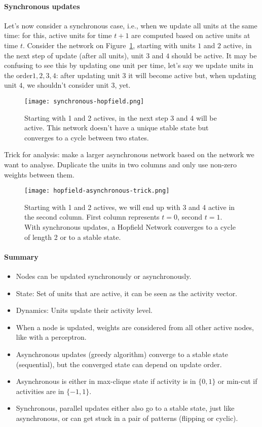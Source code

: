 \documentclass[main]{subfiles}
\begin{document}
\paragraph{Synchronous updates}
Let's now consider a synchronous case, i.e., when we update all units at the same time: for this, active units for time $t+1$ are computed based on active units at time $t$.
Consider the network on Figure~\ref{fig:synchronous-hopfield}, starting with units $1$ and $2$ active, in the next step of update (after all units), unit $3$ and $4$ should be active. It may be confusing to see this by updating one unit per time, let's say we update units in the order${1, 2, 3, 4}$: after updating unit $3$ it will become active but, when updating unit $4$, we shouldn't consider unit $3$, yet.

\begin{figure}[H]
	\centering
	\texttt{[image: synchronous-hopfield.png]}
	\caption{Starting with 1 and 2 actives, in the next step 3 and 4 will be active. This network doesn't have a unique stable state but converges to a cycle between two states.}
	\label{fig:synchronous-hopfield}
\end{figure}

Trick for analysis: make a larger asynchronous network based on the network we want to analyse. Duplicate the units in two columns and only use non-zero weights between them.

\begin{figure}[H]
	\centering
	\texttt{[image: hopfield-asynchronous-trick.png]}
	\caption{Starting with 1 and 2 actives, we will end up with 3 and 4 active in the second column. First column represents $t=0$, second $t=1$. With synchronous updates, a Hopfield Network converges to a cycle of length 2 or to a stable state.}
\end{figure}

\paragraph{Summary}
\begin{itemize}[noitemsep,nolistsep]
	\item Nodes can be updated synchronously or asynchronously.
	\item State: Set of units that are active, it can be seen as the activity vector.
	\item Dynamics: Units update their activity level.
	\item When a node is updated, weights are considered from all other active nodes, like with a perceptron.
	\item Asynchronous updates (greedy algorithm) converge to a stable state (sequential), but the converged state can depend on update order.
	\item Asynchronous is either in max-clique state if activity is in $\{0,1\}$ or min-cut if activities are in $\{-1,1\}$.
	\item Synchronous, parallel updates either also go to a stable state, just like asynchronous, or can get stuck in a pair of patterns (flipping or cyclic).
\end{itemize}
\end{document}
